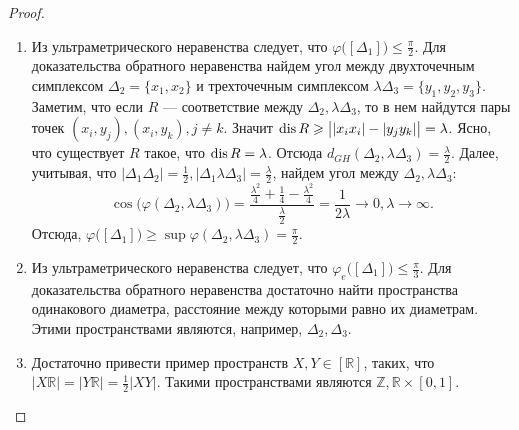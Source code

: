 \begin{proof}
  \begin{enumerate}
    \item Из ультраметрического неравенства следует, что \( \varphi
      \big([\Delta _1]\big)\le \frac{\pi }{2} \). Для доказательства
      обратного неравенства найдем угол между двухточечным симплексом
      \( \Delta _{2} = \{x_1, x_2\} \) и трехточечным симплексом \(
      \lambda \Delta _3  = \{y_1,y_2, y_3\}\). Заметим, что если \( R
      \) --- соответствие между \( \Delta _2, \lambda \Delta _3 \),
      то в нем найдутся пары точек \( (x_i,y_j), (x_i,y_k), j \neq k
      \). Значит \( \operatorname{dis} R \geqslant \big||x_ix_i|-|y_jy_k|\big|  = \lambda
      \). Ясно, что существует \( R \) такое, что \( \operatorname{dis} R = \lambda
      \). Отсюда \( d _{GH}(\Delta _2, \lambda \Delta _3) =
      \frac{\lambda }{2} \). Далее, учитывая, что \( |\Delta _1
        \Delta _2|=\frac{1}{2}, |\Delta _1 \lambda \Delta
      _3|=\frac{\lambda }{2} \), найдем угол между \( \Delta _2,
      \lambda \Delta _3 \):
      \[
        \cos \big(\varphi (\Delta _2 , \lambda \Delta _3)\big)
        =\frac{\frac{\lambda ^2}{4} + \frac{1}{4} - \frac{\lambda
        ^2}{4}}{\frac{\lambda }{2}} = \frac{1}{2 \lambda }
        \rightarrow 0, \lambda \rightarrow \infty.
      \]
      Отсюда, \( \varphi \big([\Delta _1]\big) \ge \sup \varphi
      (\Delta _2, \lambda \Delta _3) = \frac \pi 2. \)
    \item Из ультраметрического неравенства следует, что \( \varphi_e
      \big([\Delta _1]\big)\le \frac{\pi }{3} \). Для доказательства
      обратного неравенства достаточно найти пространства одинакового
      диаметра, расстояние между которыми равно их диаметрам. Этими
      пространствами являются, например, \( \Delta _2, \Delta _3 \).
    \item Достаточно привести пример пространств \( X,Y\in
      [\mathbb{R}] \), таких, что \( |X \mathbb{R}| = |Y \mathbb{R}|
      = \frac 1 2 |XY|. \) Такими пространствами являются \(
      \mathbb{Z}, \mathbb{R}\times [0,1] \).
  \end{enumerate}

\end{proof}
